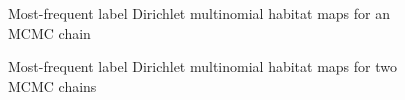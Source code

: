 \begin{figure}[H]
    \caption{Most-frequent label Dirichlet multinomial habitat maps for an MCMC chain}
\end{figure}

\begin{figure}[H]
    \caption{Most-frequent label Dirichlet multinomial habitat maps for two MCMC chains}
\end{figure}



